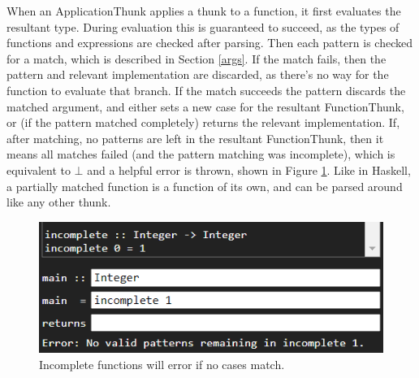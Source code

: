 When an ApplicationThunk applies a thunk to a function, it first evaluates the resultant type. During evaluation this is guaranteed to succeed, as the types of functions and expressions are checked after parsing. Then each pattern is checked for a match, which is described in Section \ref{args}. 
If the match fails, then the pattern and relevant implementation are discarded, as there's no way for the function to evaluate that branch. If the match succeeds the pattern discards the matched argument, and either sets a new case for the resultant FunctionThunk, or (if the pattern matched completely) returns the relevant implementation.
If, after matching, no patterns are left in the resultant FunctionThunk, then it means all matches failed (and the pattern matching was incomplete), which is equivalent to $\bot$ and a helpful error is thrown, shown in Figure \ref{fig:incomplete}.
Like in Haskell, a partially matched function is a function of its own, and can be parsed around like any other thunk.

\begin{figure}
    \centering
    \includegraphics[scale=0.75]{chapters/5-implementation/images/incomplete.png}
    \caption{Incomplete functions will error if no cases match.}
    \label{fig:incomplete}
\end{figure}

